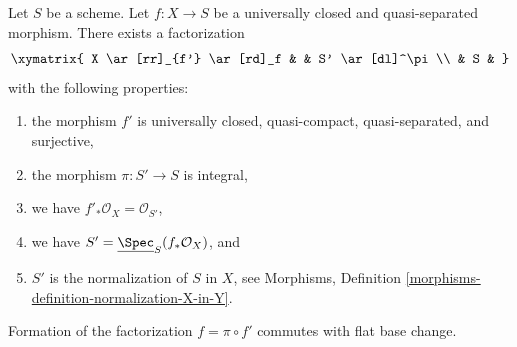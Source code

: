 \begin{lemma}
\label{lemma-stein-universally-closed}
Let $S$ be a scheme. Let $f : X \to S$ be a universally closed and
quasi-separated morphism. There exists a factorization
$$
\xymatrix{
X \ar[rr]_{f'} \ar[rd]_f & & S' \ar[dl]^\pi \\
& S &
}
$$
with the following properties:
\begin{enumerate}
\item the morphism $f'$ is universally closed, quasi-compact, quasi-separated,
and surjective,
\item the morphism $\pi : S' \to S$ is integral,
\item we have $f'_*\mathcal{O}_X = \mathcal{O}_{S'}$,
\item we have $S' = \underline{\Spec}_S(f_*\mathcal{O}_X)$, and
\item $S'$ is the normalization of $S$ in $X$, see
Morphisms, Definition \ref{morphisms-definition-normalization-X-in-Y}.
\end{enumerate}
Formation of the factorization $f = \pi \circ f'$ commutes
with flat base change.
\end{lemma}

